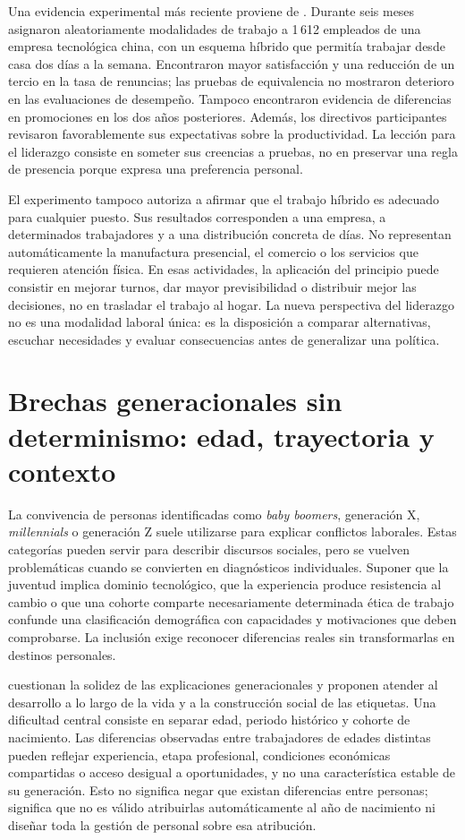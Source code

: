 \documentclass[12pt,letterpaper,oneside]{article}
\begin{document}
Una evidencia experimental más reciente proviene de \textcite{bloom2024}. Durante seis meses asignaron aleatoriamente modalidades de trabajo a 1\,612 empleados de una empresa tecnológica china, con un esquema híbrido que permitía trabajar desde casa dos días a la semana. Encontraron mayor satisfacción y una reducción de un tercio en la tasa de renuncias; las pruebas de equivalencia no mostraron deterioro en las evaluaciones de desempeño. Tampoco encontraron evidencia de diferencias en promociones en los dos años posteriores. Además, los directivos participantes revisaron favorablemente sus expectativas sobre la productividad. La lección para el liderazgo consiste en someter sus creencias a pruebas, no en preservar una regla de presencia porque expresa una preferencia personal.

El experimento tampoco autoriza a afirmar que el trabajo híbrido es adecuado para cualquier puesto. Sus resultados corresponden a una empresa, a determinados trabajadores y a una distribución concreta de días. No representan automáticamente la manufactura presencial, el comercio o los servicios que requieren atención física. En esas actividades, la aplicación del principio puede consistir en mejorar turnos, dar mayor previsibilidad o distribuir mejor las decisiones, no en trasladar el trabajo al hogar. La nueva perspectiva del liderazgo no es una modalidad laboral única: es la disposición a comparar alternativas, escuchar necesidades y evaluar consecuencias antes de generalizar una política.

\section*{Brechas generacionales sin determinismo: edad, trayectoria y contexto}

La convivencia de personas identificadas como \textit{baby boomers}, generación X, \textit{millennials} o generación Z suele utilizarse para explicar conflictos laborales. Estas categorías pueden servir para describir discursos sociales, pero se vuelven problemáticas cuando se convierten en diagnósticos individuales. Suponer que la juventud implica dominio tecnológico, que la experiencia produce resistencia al cambio o que una cohorte comparte necesariamente determinada ética de trabajo confunde una clasificación demográfica con capacidades y motivaciones que deben comprobarse. La inclusión exige reconocer diferencias reales sin transformarlas en destinos personales.

\textcite{rudolph2021} cuestionan la solidez de las explicaciones generacionales y proponen atender al desarrollo a lo largo de la vida y a la construcción social de las etiquetas. Una dificultad central consiste en separar edad, periodo histórico y cohorte de nacimiento. Las diferencias observadas entre trabajadores de edades distintas pueden reflejar experiencia, etapa profesional, condiciones económicas compartidas o acceso desigual a oportunidades, y no una característica estable de su generación. Esto no significa negar que existan diferencias entre personas; significa que no es válido atribuirlas automáticamente al año de nacimiento ni diseñar toda la gestión de personal sobre esa atribución.
\end{document}

